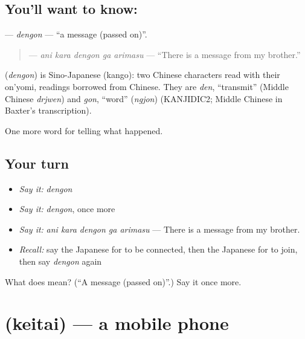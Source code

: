 \subsection*{You'll want to know: }
\textbf{} — \emph{dengon} — \textquotedblleft{}a message (passed on)\textquotedblright{}.

\begin{quote}
\textbf{  } — \emph{ani kara dengon ga arimasu} — \textquotedblleft{}There is a message from my brother.\textquotedblright{}
\end{quote}

\begin{cousinweb}
\textbf{} (\emph{dengon}) is Sino-Japanese (kango): two Chinese characters read with their on'yomi, readings borrowed from Chinese. They are \emph{den}, \textquotedblleft{}transmit\textquotedblright{} (Middle Chinese \emph{drjwen}) and \emph{gon}, \textquotedblleft{}word\textquotedblright{} (\emph{ngjon}) (KANJIDIC2; Middle Chinese in Baxter's transcription).
\end{cousinweb}

\begin{grammarlens}[title={What you've built}]
One more word for telling what happened.
\end{grammarlens}

\subsection*{Your turn}
\begin{itemize}
\raggedright
  \item \emph{Say it:} \emph{dengon}
  \item \emph{Say it:} \emph{dengon}, once more
  \item \emph{Say it:} \emph{ani kara dengon ga arimasu} — There is a message from my brother.
  \item \emph{Recall:} say the Japanese for to be connected, then the Japanese for to join, then say \emph{dengon} again
\end{itemize}

\begin{tcolorbox}[breakable,colback=teal!4,colframe=teal!35!black,title={Before you move on}]
What does  mean? (\textquotedblleft{}A message (passed on)\textquotedblright{}.) Say it once more.
\end{tcolorbox}
\section[\texorpdfstring{\ja{けいたい} (keitai)}{けいたい (keitai)}]{ (keitai) — a mobile phone}

